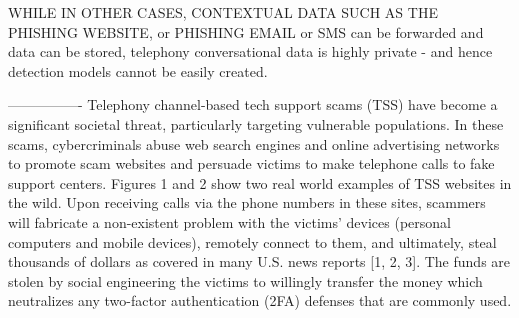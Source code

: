







WHILE IN OTHER CASES, CONTEXTUAL DATA SUCH AS THE PHISHING WEBSITE, or PHISHING EMAIL or SMS can be forwarded and data can be stored, telephony conversational data is highly private - and hence detection models cannot be easily created. 



----------------
Telephony channel-based tech support scams (TSS) have become a significant societal threat, particularly targeting vulnerable populations. In these scams, cybercriminals abuse web search engines and online advertising networks to promote scam websites and persuade victims to make telephone calls to fake support centers. Figures 1 and 2 show two real world examples of TSS websites in the wild. Upon receiving calls via the phone numbers in these sites, scammers will fabricate a non-existent problem with the victims’ devices (personal computers and mobile devices), remotely connect to them, and ultimately, steal thousands of dollars as covered in many U.S. news reports [1, 2, 3]. The funds are stolen by social engineering the victims to willingly transfer the money which neutralizes any two-factor authentication (2FA) defenses that are commonly used.

